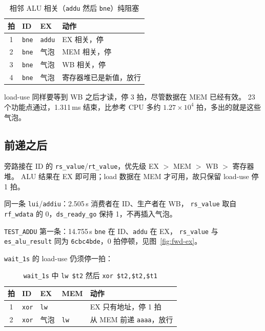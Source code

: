 \documentclass{article}
\begin{document}
\begin{table}[H]
  \centering
  \caption{相邻 ALU 相关（\texttt{addu} 然后 \texttt{bne}）纯阻塞}
  \small
  \begin{tabular}{clll}
    \toprule
    拍 & ID & EX & 动作 \\
    \midrule
    1 & \texttt{bne} & \texttt{addu} & EX 相关，停 \\
    2 & \texttt{bne} & 气泡 & MEM 相关，停 \\
    3 & \texttt{bne} & 气泡 & WB 相关，停 \\
    4 & \texttt{bne} & 气泡 & 寄存器堆已是新值，放行 \\
    \bottomrule
  \end{tabular}
\end{table}

load-use 同样要等到 WB 之后才读，停 3 拍，尽管数据在 MEM 已经有效。
23 个功能点通过，1.311\,ms 结束，比参考 CPU 多约 $1.27\times 10^{4}$ 拍，多出的就是这些气泡。

\subsection{前递之后}
旁路接在 ID 的 \texttt{rs\_value}/\texttt{rt\_value}，优先级 EX $>$ MEM $>$ WB $>$ 寄存器堆。
ALU 结果在 EX 即可用；load 数据在 MEM 才可用，故只保留 load-use 停 1 拍。

同一条 \texttt{lui}/\texttt{addiu}：2.505\,\textmu s 消费者在 ID、生产者在 WB，
\texttt{rs\_value} 取自 \texttt{rf\_wdata} 的 0，\texttt{ds\_ready\_go} 保持 1，不再插入气泡。

\texttt{TEST\_ADDU} 第一条：14.755\,\textmu s \texttt{bne} 在 ID、\texttt{addu} 在 EX，
\texttt{rs\_value} 与 \texttt{es\_alu\_result} 同为 \texttt{6cbc4bde}，0 拍停顿，见图~\ref{fig:fwd-ex}。

\texttt{wait\_1s} 的 load-use 仍须停一拍：

\begin{table}[H]
  \centering
  \caption{\texttt{wait\_1s} 中 \texttt{lw \$t2} 然后 \texttt{xor \$t2,\$t2,\$t1}}
  \small
  \begin{tabular}{cllll}
    \toprule
    拍 & ID & EX & MEM & 动作 \\
    \midrule
    1 & \texttt{xor} & \texttt{lw} &  & EX 只有地址，停 1 拍 \\
    2 & \texttt{xor} & 气泡 & \texttt{lw} & 从 MEM 前递 \texttt{aaaa}，放行 \\
    \bottomrule
  \end{tabular}
\end{table}
\end{document}
